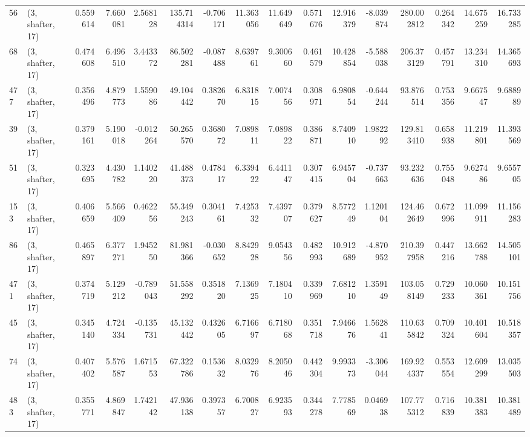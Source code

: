 \begin{tabular}{llrrrrrrrrrrrrrr}
56  &  (3, shafter, 17) &   0.559614 &   7.660081 &   2.568128 &   135.714314 &  -0.706171 &  11.363056 &  11.649649 &  0.571676 &  12.916379 &  -8.039874 &   280.002812 &   0.264342 &  14.675259 &  16.733285 \\
68  &  (3, shafter, 17) &   0.474608 &   6.496510 &   3.443372 &    86.502281 &  -0.087488 &   8.639761 &   9.300660 &  0.461579 &  10.428854 &  -5.588038 &   206.373129 &   0.457791 &  13.234310 &  14.365693 \\
477 &  (3, shafter, 17) &   0.356496 &   4.879773 &   1.559086 &    49.104442 &   0.382670 &   6.831815 &   7.007456 &  0.308971 &   6.980854 &  -0.644244 &    93.876514 &   0.753356 &   9.667547 &   9.688989 \\
39  &  (3, shafter, 17) &   0.379161 &   5.190018 &  -0.012264 &    50.265570 &   0.368072 &   7.089811 &   7.089822 &  0.386871 &   8.740910 &   1.982292 &   129.813410 &   0.658938 &  11.219801 &  11.393569 \\
51  &  (3, shafter, 17) &   0.323695 &   4.430782 &   1.140220 &    41.488373 &   0.478417 &   6.339422 &   6.441147 &  0.307415 &   6.945704 &  -0.737663 &    93.232636 &   0.755048 &   9.627486 &   9.655705 \\
153 &  (3, shafter, 17) &   0.406659 &   5.566409 &   0.462256 &    55.349243 &   0.304161 &   7.425332 &   7.439707 &  0.379627 &   8.577249 &   1.120104 &   124.462649 &   0.672996 &  11.099911 &  11.156283 \\
86  &  (3, shafter, 17) &   0.465897 &   6.377271 &   1.945250 &    81.981366 &  -0.030652 &   8.842928 &   9.054356 &  0.482993 &  10.912689 &  -4.870952 &   210.397958 &   0.447216 &  13.662788 &  14.505101 \\
471 &  (3, shafter, 17) &   0.374719 &   5.129212 &  -0.789043 &    51.558292 &   0.351820 &   7.136925 &   7.180410 &  0.339969 &   7.681210 &   1.359149 &   103.058149 &   0.729233 &  10.060361 &  10.151756 \\
45  &  (3, shafter, 17) &   0.345140 &   4.724334 &  -0.135731 &    45.132442 &   0.432605 &   6.716697 &   6.718068 &  0.351718 &   7.946676 &   1.562841 &   110.635842 &   0.709324 &  10.401604 &  10.518357 \\
74  &  (3, shafter, 17) &   0.407402 &   5.576587 &   1.671553 &    67.322786 &   0.153632 &   8.032976 &   8.205046 &  0.442304 &   9.993373 &  -3.306044 &   169.924337 &   0.553554 &  12.609299 &  13.035503 \\
483 &  (3, shafter, 17) &   0.355771 &   4.869847 &   1.742142 &    47.936138 &   0.397357 &   6.700827 &   6.923593 &  0.344278 &   7.778569 &   0.046938 &   107.775312 &   0.716839 &  10.381383 &  10.381489 \\

\end{tabular}
